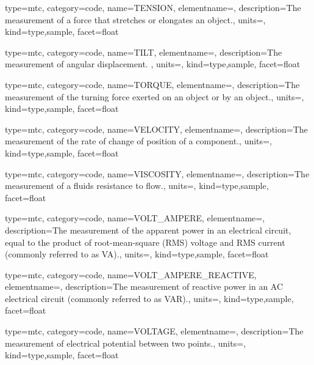 {
  type=mtc,
  category=code,
  name={TENSION},
  elementname=,
  description={The measurement of a force that stretches or elongates an object.},
  units=,
  kind={type,sample},
  facet={\gls{float}}
}


{
  type=mtc,
  category=code,
  name={TILT},
  elementname=,
  description={The measurement of angular displacement. },
  units=,
  kind={type,sample},
  facet={\gls{float}}
}


{
  type=mtc,
  category=code,
  name={TORQUE},
  elementname=,
  description={The measurement of the turning force exerted on an object or by an object.},
  units=,
  kind={type,sample},
  facet={\gls{float}}
}


{
  type=mtc,
  category=code,
  name={VELOCITY},
  elementname=,
  description={The measurement of the rate of change of position of a \gls{component}.},
  units=,
  kind={type,sample},
  facet={\gls{float}}
}


{
  type=mtc,
  category=code,
  name={VISCOSITY},
  elementname=,
  description={The measurement of a fluids resistance to flow.},
  units=,
  kind={type,sample},
  facet={\gls{float}}
}


{
  type=mtc,
  category=code,
  name={VOLT\_AMPERE},
  elementname=,
  description={The measurement of the apparent power in an electrical circuit, equal to the product of root-mean-square (RMS) voltage and RMS current (commonly referred to as VA).},
  units=,
  kind={type,sample},
  facet={\gls{float}}
}


{
  type=mtc,
  category=code,
  name={VOLT\_AMPERE\_REACTIVE},
  elementname=,
  description={The measurement of reactive power in an AC electrical circuit (commonly referred to as VAR).},
  units=,
  kind={type,sample},
  facet={\gls{float}}
}


{
  type=mtc,
  category=code,
  name={VOLTAGE},
  elementname=,
  description={The measurement of electrical potential between two points.},
  units=,
  kind={type,sample},
  facet={\gls{float}}
}


